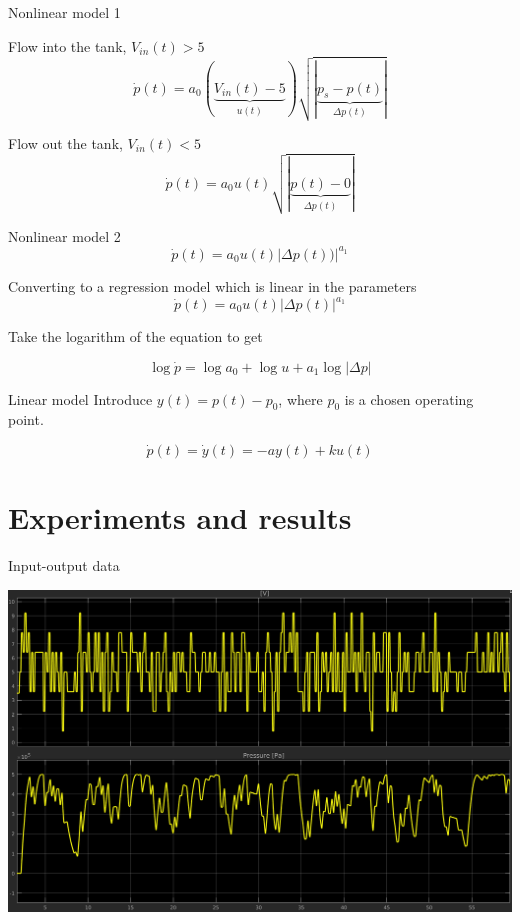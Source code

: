 \documentclass[presentation,aspectratio=1610]{beamer}
\begin{document}
\begin{frame}[label={sec:org2499e40}]{Nonlinear model 1}
\begin{block}{Flow into the tank, \(V_{in}(t) > 5\)}
\[ \dot{p}(t) = a_0(\underbrace{V_{in}(t) - 5}_{u(t)})\sqrt{|\underbrace{p_s - p(t)}_{\Delta p(t)}|} \]
\end{block}
\begin{block}{Flow out the tank, \(V_{in}(t) < 5\)}
\[ \dot{p}(t) = a_0u(t)\sqrt{|\underbrace{p(t)-0}_{\Delta p(t)}|} \]
\end{block}
\end{frame}

\begin{frame}[label={sec:orgc8a4915}]{Nonlinear model 2}
\[ \dot{p}(t) = a_0u(t)|\Delta p(t))|^{a_1} \]
\end{frame}

\begin{frame}[label={sec:org5ac1def}]{Converting to a regression model which is linear in the parameters}
\[ \dot{p}(t) = a_0u(t)|\Delta p(t)|^{a_1} \]

Take the logarithm of the equation to get

\[ \log \dot{p} = \log a_0 + \log u + a_1 \log |\Delta p|\]
\end{frame}

\begin{frame}[label={sec:org3d7146d}]{Linear model}
Introduce \(y(t) = p(t)-p_0\), where \(p_0\) is a chosen operating point.

\[ \dot{p}(t) = \dot{y}(t) = -a y(t) + ku(t)\]
\end{frame}


\section{Experiments and results}
\label{sec:orga687e3f}

\begin{frame}[label={sec:org687b35d}]{Input-output data}
\begin{center}
\includegraphics[width=0.88\linewidth]{../../figures/tank-sysid-input-output.png}
\end{center}
\end{frame}
\end{document}
